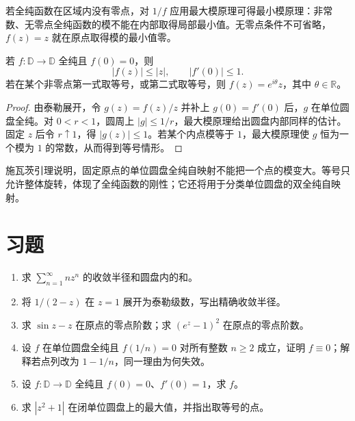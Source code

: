 若全纯函数在区域内没有零点，对 $1/f$ 应用最大模原理可得最小模原理：非常数、无零点全纯函数的模不能在内部取得局部最小值。无零点条件不可省略，$f(z)=z$ 就在原点取得模的最小值零。

\begin{theorem}[施瓦茨引理]
\label{thm:ca-schwarz}
若 $f:\mathbb D\to\mathbb D$ 全纯且 $f(0)=0$，则
\[
 |f(z)|\le|z|,\qquad |f'(0)|\le1.
\]
若在某个非零点第一式取等号，或第二式取等号，则 $f(z)=e^{i\theta}z$，其中 $\theta\in\mathbb R$。
\end{theorem}
\begin{proof}
由泰勒展开，令 $g(z)=f(z)/z$ 并补上 $g(0)=f'(0)$ 后，$g$ 在单位圆盘全纯。对 $0<r<1$，圆周上 $|g|\le1/r$，最大模原理给出圆盘内部同样的估计。固定 $z$ 后令 $r\uparrow1$，得 $|g(z)|\le1$。若某个内点模等于 $1$，最大模原理使 $g$ 恒为一个模为 $1$ 的常数，从而得到等号情形。
\end{proof}

施瓦茨引理说明，固定原点的单位圆盘全纯自映射不能把一个点的模变大。等号只允许整体旋转，体现了全纯函数的刚性；它还将用于分类单位圆盘的双全纯自映射。

\section{习题}
\label{sec:ca-series-ex}
\begin{enumerate}
 \item 求 $\sum_{n=1}^\infty n z^n$ 的收敛半径和圆盘内的和。
 \item 将 $1/(2-z)$ 在 $z=1$ 展开为泰勒级数，写出精确收敛半径。
 \item 求 $\sin z-z$ 在原点的零点阶数；求 $(e^z-1)^2$ 在原点的零点阶数。
 \item 设 $f$ 在单位圆盘全纯且 $f(1/n)=0$ 对所有整数 $n\ge2$ 成立，证明 $f\equiv0$；解释若点列改为 $1-1/n$，同一理由为何失效。
 \item 设 $f:\mathbb D\to\mathbb D$ 全纯且 $f(0)=0$、$f'(0)=1$，求 $f$。
 \item 求 $|z^2+1|$ 在闭单位圆盘上的最大值，并指出取等号的点。
\end{enumerate}

